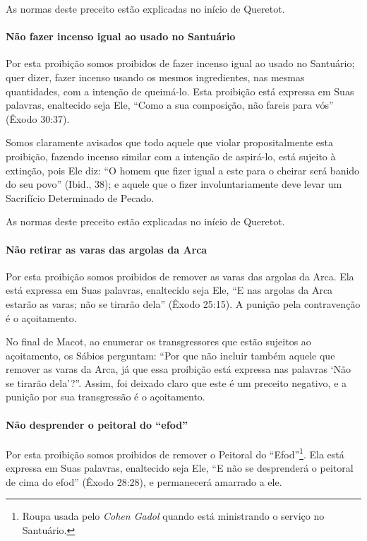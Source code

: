 As normas deste preceito estão explicadas no início de Queretot.

\paragraph{Não fazer incenso igual ao usado no Santuário}

Por esta proibição somos proibidos de fazer incenso igual ao usado no
Santuário; quer dizer, fazer incenso usando os mesmos ingredientes, nas
mesmas quantidades, com a intenção de queimá-lo. Esta proibição está
expressa em Suas palavras, enaltecido seja Ele, ``Como a sua composição,
não fareis para vós'' (Êxodo 30:37).

Somos claramente avisados que todo aquele que violar propositalmente
esta proibição, fazendo incenso similar com a intenção de aspirá-lo,
está sujeito à extinção, pois Ele diz: ``O homem que fizer igual a este
para o cheirar será banido do seu povo'' (Ibid., 38); e aquele que o
fizer involuntariamente deve levar um Sacrifício Determinado de Pecado.

As normas deste preceito estão explicadas no início de Queretot.

\paragraph{Não retirar as varas das argolas da Arca}

Por esta proibição somos proibidos de remover as varas das argolas da
Arca. Ela está expressa em Suas palavras, enaltecido seja Ele, ``E nas
argolas da Arca estarão as varas; não se tirarão dela'' (Êxodo 25:15). A
punição pela contravenção é o açoitamento.

No final de Macot, ao enumerar os transgressores que estão sujeitos ao
açoitamento, os Sábios perguntam: ``Por que não incluir também aquele
que remover as varas da Arca, já que essa proibição está expressa nas
palavras `Não se tirarão dela'?''. Assim, foi deixado claro que este é
um preceito negativo, e a punição por sua transgressão é o açoitamento.

\paragraph{Não desprender o peitoral do ``efod''}

Por esta proibição somos proibidos de remover o Peitoral do
``Efod''\footnote{Roupa usada pelo \textit{Cohen Gadol} quando está ministrando o serviço
no Santuário.}. Ela está expressa em Suas palavras,
enaltecido seja Ele, ``E não se
desprenderá o peitoral de cima do efod'' (Êxodo 28:28), e permanecerá
amarrado a ele.

